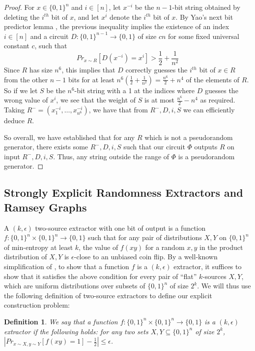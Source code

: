 \documentclass[11pt]{article}
\newtheorem{definition}{Definition}
\begin{document}
\begin{proof}
For $x \in \{0,1\}^n$ and $i \in [n]$, let $x^{-i}$ be the $n-1$-bit string obtained by deleting the $i^{th}$ bit of $x$, and let $x^i$ denote the $i^{th}$ bit of $x$. By Yao's next bit predictor lemma \cite{Yao} \cite{Vadhan}, the previous inequality implies the existence of an index $i \in [n]$ and a circuit $D: \{0,1\}^{n-1} \rightarrow \{0,1\}$ of size $cn$ for some fixed universal constant $c$, such that 
\[
Pr_{x \sim R}[D(x^{-i}) = x^i] > \frac{1}{2} + \frac{1}{n^2}
\]
Since $R$ has size $n^6$, this implies that $D$ correctly guesses the $i^{th}$ bit of $x \in R$ from the other $n-1$ bits for at least $n^6(\frac{1}{2} + \frac{1}{n^2}) = \frac{n^6}{2} + n^4$ of the elements of $R$. So if we let $S$ be the $n^6$-bit string with a 1 at the indices where $D$ guesses the wrong value of $x^i$, we see that the weight of $S$ is at most $\frac{n^6}{2} - n^4$ as required. Taking $R^- = (x_1^{-i}, \ldots, x_{n^6}^{-i})$, we have that from $R^-,D,i,S$ we can efficiently deduce $R$.

So overall, we have established that for any $R$ which is not a pseudorandom generator, there exists some $R^-,D,i,S$ such that our circuit $\Phi$ outputs $R$ on input $R^-,D,i,S$. Thus, any string outside the range of $\Phi$ is a pseudorandom generator.
\end{proof}

\subsection{Strongly Explicit Randomness Extractors and Ramsey Graphs}

A $(k,\epsilon)$ two-source extractor with one bit of output is a function $f: \{0,1\}^n \times \{0,1\}^n \rightarrow \{0,1\}$ such that for any pair of distributions $X,Y$ on $\{0,1\}^n$ of min-entropy at least $k$, the value of $f(xy)$ for a random $x,y$ in the product distribution of $X,Y$ is $\epsilon$-close to an unbiased coin flip. By a well-known simplification of \cite{flat-sources}, to show that a function $f$ is a $(k,\epsilon)$ extractor, it suffices to show that it satisfies the above condition for every pair of ``flat'' $k$-sources $X,Y$, which are uniform distributions over subsets of $\{0,1\}^n$ of size $2^k$. We will thus use the following definition of two-source extractors to define our explicit construction problem:
\begin{definition}
We say that a function $f:\{0,1\}^n \times \{0,1\}^n \rightarrow \{0,1\}$ is a $(k,\epsilon)$ extractor if the following holds: for any two sets $X,Y \subseteq \{0,1\}^n$ of size $2^k$, $|Pr_{x \sim X, y \sim Y}[f(xy) = 1] - \frac{1}{2}| \leq \epsilon$.
\end{definition}
\end{document}
